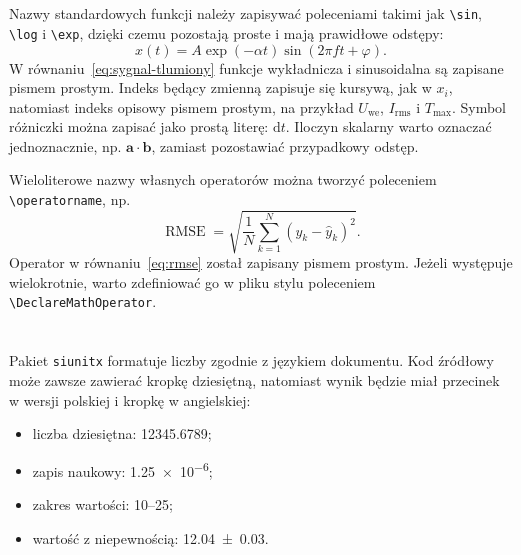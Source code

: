 \section{}

Nazwy standardowych funkcji należy zapisywać poleceniami takimi jak \verb|\sin|,
\verb|\log| i \verb|\exp|, dzięki czemu pozostają proste i mają prawidłowe odstępy:
\begin{equation}
  x(t)=A\exp(-\alpha t)\sin(2\pi f t+\varphi).
  \label{eq:sygnal-tlumiony}
\end{equation}
W równaniu~\ref{eq:sygnal-tlumiony} funkcje wykładnicza i sinusoidalna są zapisane pismem prostym. Indeks będący zmienną zapisuje się kursywą, jak w $x_i$, natomiast indeks opisowy
pismem prostym, na przykład $U_{\mathrm{we}}$, $I_{\mathrm{rms}}$ i $T_{\max}$.
Symbol różniczki można zapisać jako prostą literę: $\mathrm{d}t$. Iloczyn skalarny
warto oznaczać jednoznacznie, np. $\boldsymbol{a}\cdot\boldsymbol{b}$, zamiast
pozostawiać przypadkowy odstęp.

Wieloliterowe nazwy własnych operatorów można tworzyć poleceniem
\verb|\operatorname|, np.
\begin{equation}
  \operatorname{RMSE}
    = \sqrt{\frac{1}{N}\sum_{k=1}^{N}(y_k-\hat{y}_k)^2}.
  \label{eq:rmse}
\end{equation}
Operator w równaniu~\ref{eq:rmse} został zapisany pismem prostym. Jeżeli występuje wielokrotnie, warto zdefiniować go w pliku stylu poleceniem
\verb|\DeclareMathOperator|.

\section{}

Pakiet \texttt{siunitx} formatuje liczby zgodnie z językiem dokumentu. Kod źródłowy
może zawsze zawierać kropkę dziesiętną, natomiast wynik będzie miał przecinek w wersji
polskiej i kropkę w angielskiej:
\begin{itemize}
  \item liczba dziesiętna: \num{12345.6789};
  \item zapis naukowy: \num{1.25e-6};
  \item zakres wartości: \numrange{10}{25};
  \item wartość z niepewnością: \num{12.04(3)}.
\end{itemize}

